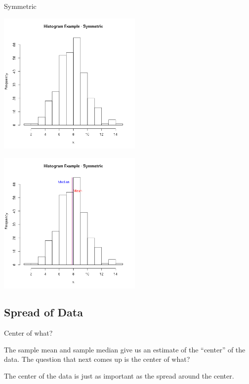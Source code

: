 \begin{frame}{Symmetric}

  {
    \includegraphics[width=7cm]{img/symmetric}
  }

  {
    \includegraphics[width=7cm]{img/symmetricAnnotated}
  }

  
\end{frame}


\subsection{Spread of Data}

\begin{frame}{Center of what?}

  The sample mean and sample median give us an estimate of the
  ``center'' of the data. The question that next comes up is the
  center of what?

  The center of the data is just as important as the spread around the
  center.
  
\end{frame}

